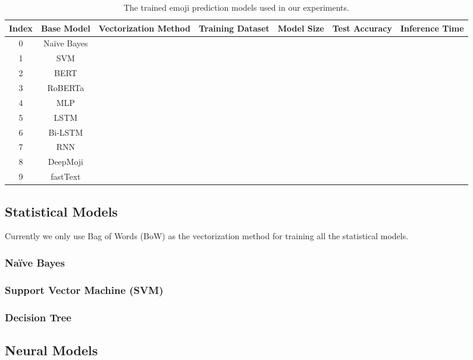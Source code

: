 \documentclass[12pt, a4paper]{article}
\begin{document}
\begin{table}[h]
	\centering
	\caption{The trained emoji prediction models used in our experiments.}
	\label{table:selected_emoji_prediction_models}
	\begin{tabular}{c|c|c|c|c|c|c}
		\hline
		\textbf{Index} & \textbf{Base Model} & \textbf{Vectorization Method} & \textbf{Training Dataset} & \textbf{Model Size} & \textbf{Test Accuracy} & \textbf{Inference Time} \\
		\hline
		0 & Na\"ive Bayes &  &  &  &  \\
		1 & SVM &  &  &  &  \\
		2 & BERT &  &  &  &  \\
		3 & RoBERTa &  &  &  &  \\
		4 & MLP &  &  &  &  \\
		5 & LSTM &  &  &  &  \\
		6 & Bi-LSTM &  &  &  &  \\
		7 & RNN &  &  &  &  \\
		8 & DeepMoji &  &  &  &  \\
		9 & fastText &  &  &  &  \\
		\hline
	\end{tabular}
\end{table}

\subsection{Statistical Models}

Currently we only use Bag of Words (BoW) as the vectorization method for training all the statistical models.

\subsubsection{Na\"ive Bayes}

\subsubsection{Support Vector Machine (SVM)}

\subsubsection{Decision Tree}

\subsection{Neural Models}
\end{document}
